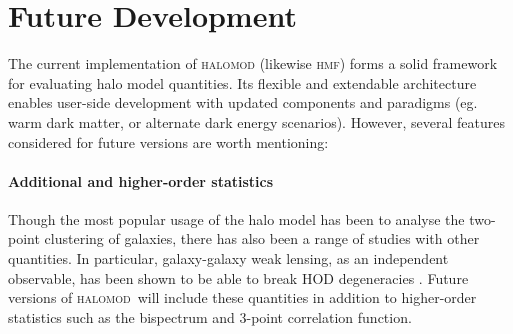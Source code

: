 \documentclass[5p,aas_macros]{elsarticle}
\newcommand{\halomod}{\textsc{halomod}}
\begin{document}



\section{Future Development}
\label{sec:future}
The current implementation of \textsc{halomod} (likewise \textsc{hmf}) forms a solid framework for evaluating halo model quantities. Its flexible and extendable architecture enables user-side development with updated components and paradigms (eg. warm dark matter, or alternate dark energy scenarios). However, several features considered for future versions are worth mentioning:

\paragraph*{Additional and higher-order statistics}
Though the most popular usage of the halo model has been to analyse the two-point clustering of galaxies, there has also been a range of studies with other quantities. In particular, galaxy-galaxy weak lensing, as an independent observable, has been shown to be able to break HOD degeneracies \citep{Leauthaud2012}. Future versions of \halomod\  will include these quantities in addition to higher-order statistics such as the bispectrum and 3-point correlation function. 
\end{document}
